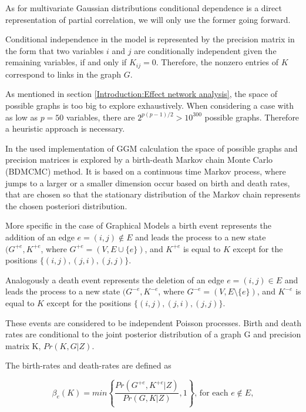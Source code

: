 \documentclass[a4paper,12pt,twoside,openright]{report}
\begin{document}
As for multivariate Gaussian distributions conditional dependence is a direct representation of partial correlation\cite{10.1111/j.1467-842X.2004.00360.x}, we will only use the former going forward.

Conditional independence in the model is represented by the precision matrix in the form that two variables $i$ and $j$ are conditionally independent given the remaining variables, if and only if $K_{ij} = 0$. Therefore, the nonzero entries of $K$ correspond to links in the graph $G$.  

As mentioned in section \ref{Introduction:Effect network analysis}, the space of possible graphs is too big to explore exhaustively. When considering a case with as low as $p = 50$ variables, there are $2^{p(p-1)/2} > 10^{300}$ possible graphs. Therefore a heuristic approach is necessary. 

In the used implementation of GGM calculation the space of possible graphs and precision matrices is explored by a birth-death Markov chain Monte Carlo (BDMCMC) method. It is based on a continuous time Markov process, where jumps to a larger or a smaller dimension occur based on birth and death rates, that are chosen so that the stationary distribution of the Markov chain represents the chosen posteriori distribution.

More specific in the case of Graphical Models a birth event represents the addition of an edge $e = (i,j) \notin E$ and leads the process to a new state $(G^{+e}, K^{+e}$, where $G^{+e} = (V, E \cup \{e\})$, and $K^{+e}$ is equal to $K$ except for the positions $\lbrace (i,j), (j,i), (j,j) \rbrace$.

Analogously a death event represents the deletion of an edge $e = (i,j) \in E$ and leads the process to a new state $(G^{-e}, K^{-e}$, where $G^{-e} = (V, E \setminus \{e\})$, and $K^{-e}$ is equal to $K$ except for the positions $\lbrace (i,j), (j,i), (j,j) \rbrace$.

These events are considered to be independent Poisson processes. Birth and death rates are conditional to the joint posterior distribution of a graph G and precision matrix K, $Pr(K,G|Z)$.

The birth-rates and death-rates are defined as

\begin{equation}
\beta _e(K)=min\left\lbrace \frac{Pr(G^{+e}, K^{+e}|Z)}{Pr(G,K|Z)},1 \right\rbrace \text{, for each }  e \notin E,
\end{equation}
\end{document}

